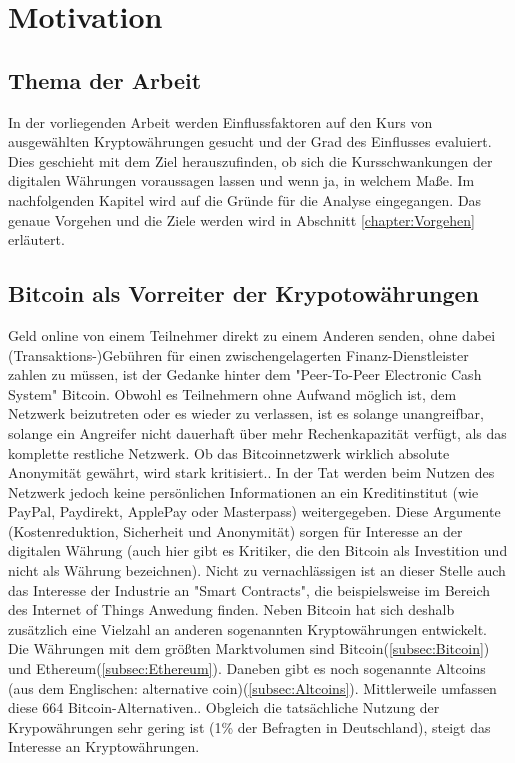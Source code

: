 \chapter{Motivation}

\section{Thema der Arbeit}
In der vorliegenden Arbeit werden Einflussfaktoren auf den Kurs von ausgewählten Kryptowährungen gesucht und der Grad des Einflusses evaluiert. Dies geschieht mit dem Ziel herauszufinden, ob sich die Kursschwankungen der digitalen Währungen voraussagen lassen und wenn ja, in welchem Maße. Im nachfolgenden Kapitel wird auf die Gründe für die Analyse eingegangen. Das genaue Vorgehen und die Ziele werden wird in Abschnitt \ref{chapter:Vorgehen} erläutert.

\section{Bitcoin als Vorreiter der Krypotowährungen}
Geld online von einem Teilnehmer direkt zu einem Anderen senden, ohne dabei (Transaktions-)Gebühren für einen zwischengelagerten Finanz-Dienstleister zahlen zu müssen, ist der Gedanke hinter dem "Peer-To-Peer Electronic Cash System"\citep{nakamoto_bitcoin:_2008} Bitcoin. Obwohl es Teilnehmern ohne Aufwand möglich ist, dem Netzwerk beizutreten oder es wieder zu verlassen, ist es solange unangreifbar, solange ein Angreifer nicht dauerhaft über mehr Rechenkapazität verfügt, als das komplette restliche Netzwerk.\citep{nakamoto_bitcoin:_2008} Ob das Bitcoinnetzwerk wirklich absolute Anonymität gewährt, wird stark kritisiert.\citep{reid_analysis_2013,androulaki_evaluating_2013}. In der Tat werden beim Nutzen des Netzwerk jedoch keine persönlichen Informationen an ein Kreditinstitut (wie PayPal, Paydirekt, ApplePay oder Masterpass) weitergegeben. Diese Argumente (Kostenreduktion, Sicherheit und Anonymität) sorgen für Interesse an der digitalen Währung (auch hier gibt es Kritiker, die den Bitcoin als Investition und nicht als Währung bezeichnen)\citep{baur_bitcoin:_2015}. Nicht zu vernachlässigen ist an dieser Stelle auch das Interesse der Industrie an "Smart Contracts", die beispielsweise im Bereich des Internet of Things Anwedung finden.\citep{christidis_blockchains_2016}\newline
Neben Bitcoin hat sich deshalb zusätzlich eine Vielzahl an anderen sogenannten Kryptowährungen entwickelt. Die Währungen mit dem größten Marktvolumen sind  Bitcoin(\ref{subsec:Bitcoin}) und Ethereum(\ref{subsec:Ethereum})\citep{wood_ethereum:_2014}.\citep{brandt_infografik:_2017, coinmarketcap_ranking_2017} Daneben gibt es noch sogenannte Altcoins (aus dem Englischen: alternative coin\citep{prableen_bajpai_altcoin_2014})(\ref{subsec:Altcoins}). Mittlerweile umfassen diese 664 Bitcoin-Alternativen.\citep{coindesk_anzahl_2017}. Obgleich die tatsächliche Nutzung der Krypowährungen sehr gering ist (1\% der Befragten in Deutschland\citep{tsys_kennen_2016}), steigt das Interesse an Kryptowährungen\citep{wiki_trends_compare_2017,googletrends_googletrends_2017}.\newline
{}



